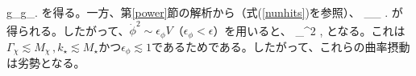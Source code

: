 \beq
\langle\delta g_\chi\delta g_\chi\rangle \simeq {}.
\eeq
を得る。一方、第\ref{power}節の解析から（式(\ref{nunhits})を参照）、
\beq
\langle\zeta_\phi\zeta_\phi\rangle \simeq {}  .
\eeq
が得られる。したがって、$\dot\phi^2 \sim \epsilon_\phi V$（$\epsilon_\phi < \epsilon$）を用いると、
\beq
  \simeq {} \epsilon_\phi^2 ,\eeq
となる。これは$\Gamma_\chi\lesssim M_\chi\,, k_\star\lesssim M_\star$かつ$\epsilon_\phi\lesssim 1$であるためである。したがって、これらの曲率摂動は劣勢となる。




